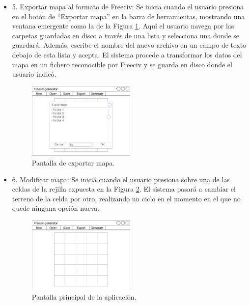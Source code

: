 \begin{itemize}
	\item 5. Exportar mapa al formato de Freeciv: Se inicia cuando el usuario presiona en el botón de ``Exportar mapa'' en la barra de herramientas, mostrando una ventana emergente como la de la Figura \ref{fig:exportmock}. Aquí el usuario navega por las carpetas guardadas en disco a través de una lista y selecciona una donde se guardará. Además, escribe el nombre del nuevo archivo en un campo de texto debajo de esta lista y acepta. El sistema procede a transformar los datos del mapa en un fichero reconocible por Freeciv y se guarda en disco donde el usuario indicó.
	
	\begin{figure}[!h]
		\centering
		\includegraphics[width=0.5\textwidth]{images/export-map.pdf}
		\caption{Pantalla de exportar mapa.}
		\label{fig:exportmock}
	\end{figure}
	
	\item 6. Modificar mapa: Se inicia cuando el usuario presiona sobre una de las celdas de la rejilla expuesta en la Figura \ref{fig:mainmock}. El sistema pasará a cambiar el terreno de la celda por otro, realizando un ciclo en el momento en el que no quede ninguna opción nueva.
	
	\begin{figure}[!h]
		\centering
		\includegraphics[width=0.5\textwidth]{images/aplicacion.pdf}
		\caption{Pantalla principal de la aplicación.}
		\label{fig:mainmock}
	\end{figure}

\end{itemize}

